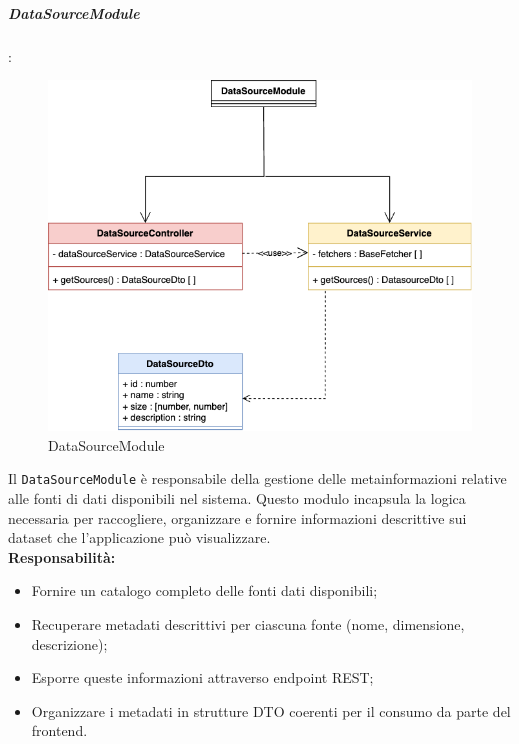 \subparagraph{DataSourceModule}: 

\begin{figure}[H] 
    \centering
    \includegraphics[scale = 0.4]{template/images/uml_back/DataSourceModule.png}
    \caption{DataSourceModule}
\end{figure}

Il \texttt{DataSourceModule} è responsabile della gestione delle metainformazioni relative alle fonti di dati disponibili nel sistema. Questo modulo incapsula la logica necessaria per raccogliere, organizzare e fornire informazioni descrittive sui dataset che l'applicazione può visualizzare.\\

\textbf{Responsabilità:}
\begin{itemize}
    \item Fornire un catalogo completo delle fonti dati disponibili;
    \item Recuperare metadati descrittivi per ciascuna fonte (nome, dimensione, descrizione);
    \item Esporre queste informazioni attraverso endpoint REST;
    \item Organizzare i metadati in strutture DTO coerenti per il consumo da parte del frontend.
\end{itemize}

